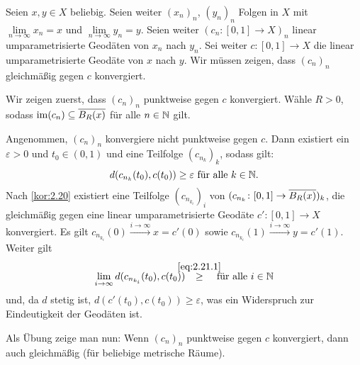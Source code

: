 \begin{beweis}
	Seien $x,y \in X$ beliebig.
	Seien weiter $(x_n)_n$, $(y_n)_n$ Folgen in $X$ mit $\lim\limits_{n \rightarrow \infty} x_n = x$ und $\lim\limits_{n \rightarrow \infty} y_n = y$.
	Seien weiter $(c_n\colon [0,1] \rightarrow X)_n$ linear umparametrisierte Geodäten von $x_n$ nach $y_n$.
	Sei weiter $c \colon [0,1] \rightarrow X$ die linear umparametrisierte Geodäte von $x$ nach $y$.
	Wir müssen zeigen, dass $(c_n)_n$ gleichmäßig gegen $c$ konvergiert.
	
	Wir zeigen zuerst, dass $(c_n)_n$ punktweise gegen $c$ konvergiert.
	Wähle $R > 0$, sodass $\operatorname{im}(c_n) \subseteq \overline{B_R(x)}$ für alle $n \in \mathbb{N}$ gilt.
	
	Angenommen, $(c_n)_n$ konvergiere nicht punktweise gegen $c$.
	Dann existiert ein $\varepsilon > 0$ und $t_0 \in (0,1)$ und eine Teilfolge $(c_{n_k})_k$, sodass gilt:
	\begin{equation}
		d(c_{n_k}(t_0),c(t_0)) \geq \varepsilon \text{ für alle } k \in \mathbb{N}. \label{eq:2.21.1}
	\end{equation}
	Nach \autoref{kor:2.20} existiert eine Teilfolge $(c_{n_{k_i}})_i$ von $(c_{n_k}\colon [0,1] \rightarrow \overline{B_R(x)})_k$, die gleichmäßig gegen eine linear umparametrisierte Geodäte $c'\colon [0,1] \rightarrow X$ konvergiert.
	Es gilt $c_{n_{k_i}}(0) \xrightarrow{i \rightarrow \infty} x = c'(0)$ sowie $c_{n_{k_i}}(1) \xrightarrow{i \rightarrow \infty} y = c'(1)$. Weiter gilt
	\[
		\lim\limits_{i \rightarrow \infty} d(c_{n_{k_i}}(t_0),c(t_0)) \stack{\eqref{eq:2.21.1}}{\geq} \text{ für alle } i \in \NN
	\]
	und, da $d$ stetig ist, $d(c'(t_0),c(t_0)) \geq \varepsilon$, was ein Widerspruch zur Eindeutigkeit der Geodäten ist.
	
	Als Übung zeige man nun: Wenn $(c_n)_n$ punktweise gegen $c$ konvergiert, dann auch gleichmäßig (für beliebige metrische Räume). \qedhere
\end{beweis}


